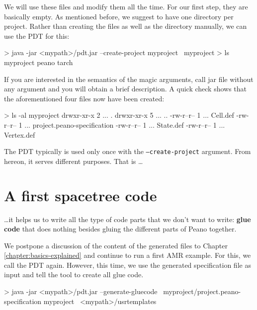 \noindent
We will use these files and modify them all the time. For our first step, they
are basically empty.
As mentioned before, we suggest to have one directory per project.
Rather than creating the files as well as the directory manually, we can use the
PDT for this:

\begin{code}
> java -jar <mypath>/pdt.jar  --create-project myproject \
  myproject 
> ls
  myproject  peano  tarch
\end{code}

\noindent
If you are interested in the semantics of the magic arguments, call jar file
without any argument and you will obtain a brief description.
A quick check shows that the aforementioned four files now have been created:


\begin{code}
> ls -al myproject
drwxr-xr-x 2 ...  .
drwxr-xr-x 5 ...  ..
-rw-r--r-- 1 ...  Cell.def
-rw-r--r-- 1 ...  project.peano-specification
-rw-r--r-- 1 ...  State.def
-rw-r--r-- 1 ...  Vertex.def
\end{code}

\noindent
The PDT typically is used only once with the \texttt{--create-project} argument.
From hereon, it serves different purposes. 
That is \ldots




\section{A first spacetree code}

\ldots it helps us to write all the type of code parts that we don't want to
write: {\bf glue code} that does nothing besides gluing the different parts of
Peano together.

We postpone a discussion of the content of the generated files to Chapter
\ref{chapter:basics-explained} and continue to run a first AMR example.
For this, we call the PDT again.
However, this time, we use the generated specification file as input and tell
the tool to create all glue code.


\begin{code}
> java -jar <mypath>/pdt.jar --generate-gluecode \
  myproject/project.peano-specification myproject \
  <mypath>/usrtemplates
\end{code}

